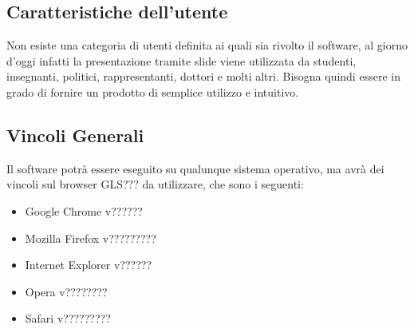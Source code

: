 \subsection{Caratteristiche dell'utente}
Non esiste una categoria di utenti definita ai quali sia rivolto il software, al giorno d'oggi infatti la presentazione tramite slide viene utilizzata da studenti, insegnanti, politici, rappresentanti, dottori e molti altri. Bisogna quindi essere in grado di fornire un prodotto di semplice utilizzo e intuitivo.

\subsection{Vincoli Generali}
Il software potrà essere eseguito su qualunque sistema operativo, ma avrà dei vincoli sul browser GLS??? da utilizzare, che sono i seguenti:
\begin{itemize}
	\item Google Chrome v??????
	\item Mozilla Firefox v?????????
	\item Internet Explorer v??????
	\item Opera v????????
	\item Safari v?????????
\end{itemize}
